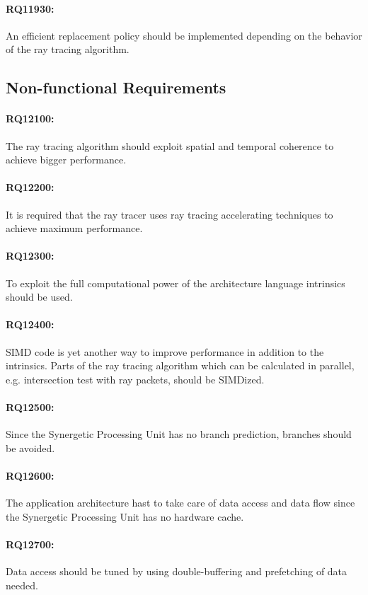 \documentclass[DIV10, abstracton, openright, footsepline, headsepline, twoside, 9pt,
bigheadings]{scrreprt}
\begin{document}
\paragraph{RQ11930:} An efficient replacement policy should be implemented depending
on the behavior of the ray tracing algorithm.


\subsection{Non-functional Requirements}
\paragraph{RQ12100:} The ray tracing
algorithm should exploit spatial and temporal coherence to achieve bigger
performance.
\paragraph{RQ12200:} It is required that the ray tracer uses ray tracing
accelerating techniques to achieve maximum performance.
\paragraph{RQ12300:} To exploit the
full computational power of the architecture language intrinsics should be used.
\paragraph{RQ12400:} SIMD code is yet another way to improve performance in addition
to the
intrinsics. Parts of the ray tracing algorithm which can be calculated in
parallel, e.g. intersection test with ray packets, should be SIMDized.
\paragraph{RQ12500:}
Since the Synergetic Processing Unit has no branch prediction, branches
should be avoided.
\paragraph{RQ12600:} The application architecture hast to take care of
data access and data flow since the Synergetic Processing Unit has no hardware
cache.
\paragraph{RQ12700:} Data access should be tuned by using double-buffering and
prefetching of data needed.
\end{document}
